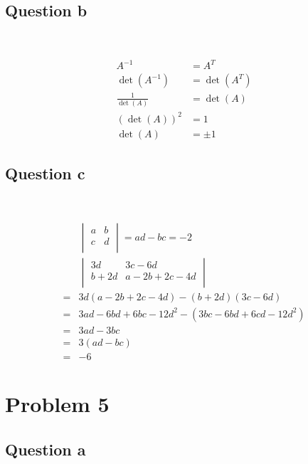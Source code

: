 \documentclass{article}
\begin{document}
\subsection{Question b}

~

\begin{equation*}
    \begin{split}
        A^{-1}&=A^T\\
        \det(A^{-1})&=\det(A^T)\\
        \frac{1}{\det(A)}&=\det(A)\\
        (\det(A))^2&=1\\
        \det(A)&=\pm 1
    \end{split}
\end{equation*}

\subsection{Question c}

~

\begin{equation*}
    \begin{split}
        &\begin{vmatrix}
            a&b\\
            c&d\\
        \end{vmatrix}=ad-bc=-2\\
        &\begin{vmatrix}
            3d&3c-6d\\
            b+2d&a-2b+2c-4d\\
        \end{vmatrix}\\
        =&3d(a-2b+2c-4d)-(b+2d)(3c-6d)\\
        =&3ad-6bd+6bc-12d^2-(3bc-6bd+6cd-12d^2)\\
        =&3ad-3bc\\
        =&3(ad-bc)\\
        =&-6
    \end{split}
\end{equation*}

\newpage

\section{Problem 5}

\subsection{Question a}
\end{document}
